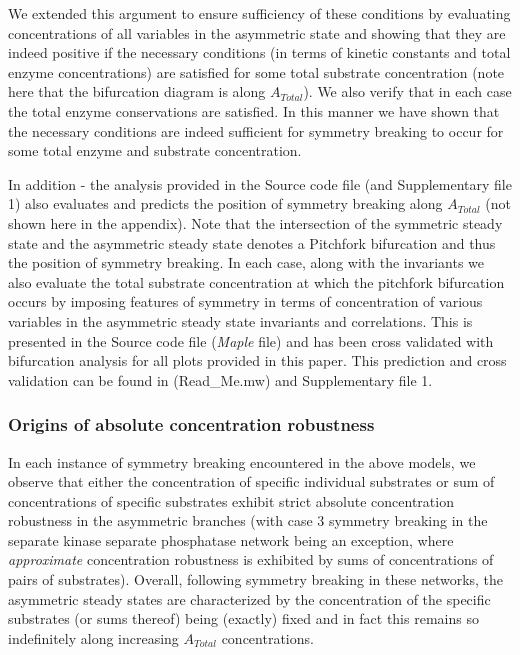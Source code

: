 \documentclass[9pt,lineno]{elife}
\begin{document}
\begin{appendixbox}
We extended this argument to ensure sufficiency of these conditions by evaluating concentrations of all variables in the asymmetric state and showing that they are indeed positive if the necessary conditions (in terms of kinetic constants and total enzyme concentrations) are satisfied for some total substrate concentration (note here that the bifurcation diagram is along $A_{Total}$). We also verify that in each case the total enzyme conservations are satisfied. In this manner we have shown that the necessary conditions are indeed sufficient for symmetry breaking to occur for some total enzyme and substrate concentration.

In addition - the analysis provided in the Source code file (and Supplementary file 1) also evaluates and predicts the position of symmetry breaking along $A_{Total}$ (not shown here in the appendix). Note that the intersection of the symmetric steady state and the asymmetric steady state denotes a Pitchfork bifurcation and thus the position of symmetry breaking. In each case, along with the invariants we also evaluate the total substrate concentration at which the pitchfork bifurcation occurs by imposing features of symmetry in terms of concentration of various variables in the asymmetric steady state invariants and correlations. This is presented in the Source code file (\textit{Maple} file) and has been cross validated with bifurcation analysis for all plots provided in this paper. This prediction and cross validation can be found in (\textrm{Read\_Me.mw}) and Supplementary file 1.

\subsubsection*{Origins of absolute concentration robustness}

In each instance of symmetry breaking encountered in the above models, we observe that either the concentration of specific individual substrates or sum of concentrations of specific substrates exhibit strict absolute concentration robustness in the asymmetric branches (with case 3 symmetry breaking in the separate kinase separate phosphatase network being an exception, where \textit{approximate} concentration robustness is exhibited by sums of concentrations of pairs of substrates). Overall, following symmetry breaking in these networks, the asymmetric steady states are characterized by the concentration of the specific substrates (or sums thereof) being (exactly) fixed and in fact this remains so indefinitely along increasing $A_{Total}$ concentrations. 


\end{appendixbox}
\end{document}
